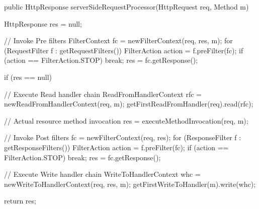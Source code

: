 \begin{listing}{1}
public HttpResponse serverSideRequestProcessor(HttpRequest req, Method m) {
    HttpResponse res = null;

    // Invoke Pre filters
    FilterContext fc = newFilterContext(req, res, m);
    for (RequestFilter f : getRequestFilters()) {
        FilterAction action = f.preFilter(fc);
        if (action == FilterAction.STOP) break;
    }
    res = fc.getResponse();

    if (res == null) {
        // Execute Read handler chain
        ReadFromHandlerContext rfc = newReadFromHandlerContext(req, m);
        getFirstReadFromHandler(req).read(rfc);

        // Actual resource method invocation
        res = executeMethodInvocation(req, m);
    }

    // Invoke Post filters
    fc = newFilterContext(req, res);
    for (ResponseFilter f : getResponseFilters()) {
        FilterAction action = f.preFilter(fc);
        if (action == FilterAction.STOP) break;
    }
    res = fc.getResponse();       

    // Execute Write handler chain
    WriteToHandlerContext whc = newWriteToHandlerContext(req, res, m);
    getFirstWriteToHandler(m).write(whc);

    return res;
}
\end{listing}